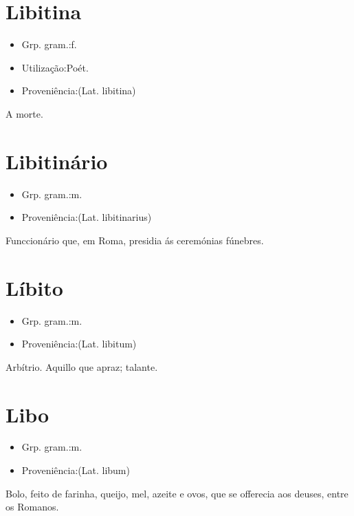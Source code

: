 \section{Libitina}
\begin{itemize}
\item {Grp. gram.:f.}
\end{itemize}
\begin{itemize}
\item {Utilização:Poét.}
\end{itemize}
\begin{itemize}
\item {Proveniência:(Lat. \textunderscore libitina\textunderscore )}
\end{itemize}
A morte.
\section{Libitinário}
\begin{itemize}
\item {Grp. gram.:m.}
\end{itemize}
\begin{itemize}
\item {Proveniência:(Lat. \textunderscore libitinarius\textunderscore )}
\end{itemize}
Funccionário que, em Roma, presidia ás ceremónias fúnebres.
\section{Líbito}
\begin{itemize}
\item {Grp. gram.:m.}
\end{itemize}
\begin{itemize}
\item {Proveniência:(Lat. \textunderscore libitum\textunderscore )}
\end{itemize}
Arbítrio.
Aquillo que apraz; talante.
\section{Libo}
\begin{itemize}
\item {Grp. gram.:m.}
\end{itemize}
\begin{itemize}
\item {Proveniência:(Lat. \textunderscore libum\textunderscore )}
\end{itemize}
Bolo, feito de farinha, queijo, mel, azeite e ovos, que se offerecia aos deuses, entre os Romanos.
